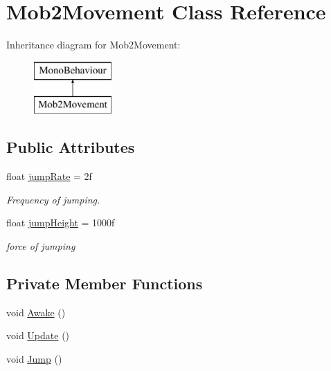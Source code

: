 \hypertarget{class_mob2_movement}{}\section{Mob2\+Movement Class Reference}
\label{class_mob2_movement}
Inheritance diagram for Mob2\+Movement\+:\begin{figure}[H]
\begin{center}
\leavevmode
\includegraphics[height=2.000000cm]{class_mob2_movement}
\end{center}
\end{figure}
\subsection*{Public Attributes}
\begin{DoxyCompactItemize}
\item 
\mbox{\label{class_mob2_movement_a562eaed5122c4ab12bd8e6da9ee5cae4}} 
float \hyperlink{class_mob2_movement_a562eaed5122c4ab12bd8e6da9ee5cae4}{jump\+Rate} = 2f
\begin{DoxyCompactList}\small\item\em Frequency of jumping. \end{DoxyCompactList}\item 
\mbox{\label{class_mob2_movement_a55cced54062a86039e52800d49c65f18}} 
float \hyperlink{class_mob2_movement_a55cced54062a86039e52800d49c65f18}{jump\+Height} = 1000f
\begin{DoxyCompactList}\small\item\em force of jumping \end{DoxyCompactList}\end{DoxyCompactItemize}
\subsection*{Private Member Functions}
\begin{DoxyCompactItemize}
\item 
void \hyperlink{class_mob2_movement_a1caeb0925d5a847a3458ba312c35adb9}{Awake} ()
\item 
void \hyperlink{class_mob2_movement_ad5700e3c04953999dc85ba86cbcf889d}{Update} ()
\item 
void \hyperlink{class_mob2_movement_aedc7ef856890634eafcb09ed1e6d0a5f}{Jump} ()
\end{DoxyCompactItemize}
